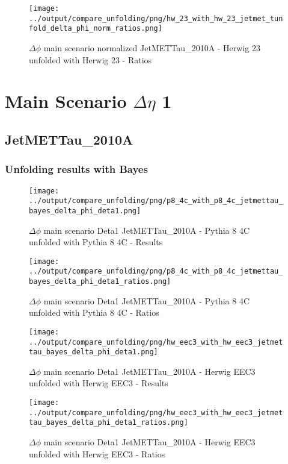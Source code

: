 \documentclass[11pt]{book}
\begin{document}
\begin{figure}[ht]
\centering
\texttt{[image: ../output/compare\_unfolding/png/hw\_23\_with\_hw\_23\_jetmet\_tunfold\_delta\_phi\_norm\_ratios.png]}
\caption{$\Delta\phi$ main scenario normalized JetMETTau\_2010A - Herwig 23 unfolded with Herwig 23 - Ratios}
\label{hw_23_jetmet_tunfold_delta_phi_norm_b}
\end{figure}




\clearpage
\chapter{Main Scenario $\Delta\eta$ 1 }
\section{JetMETTau\_2010A}
\subsection{Unfolding results with Bayes}

\begin{figure}[ht]
\centering
\texttt{[image: ../output/compare\_unfolding/png/p8\_4c\_with\_p8\_4c\_jetmettau\_bayes\_delta\_phi\_deta1.png]}
\caption{$\Delta\phi$ main scenario Deta1 JetMETTau\_2010A - Pythia 8 4C unfolded with Pythia 8 4C - Results}
\label{p8_p8_jetmettau_bayes_delta_phi_deta1_a}
\end{figure}

\begin{figure}[ht]
\centering
\texttt{[image: ../output/compare\_unfolding/png/p8\_4c\_with\_p8\_4c\_jetmettau\_bayes\_delta\_phi\_deta1\_ratios.png]}
\caption{$\Delta\phi$ main scenario Deta1 JetMETTau\_2010A - Pythia 8 4C unfolded with Pythia 8 4C - Ratios}
\label{p8_p8_jetmettau_bayes_delta_phi_deta1_b}
\end{figure}

\begin{figure}[ht]
\centering
\texttt{[image: ../output/compare\_unfolding/png/hw\_eec3\_with\_hw\_eec3\_jetmettau\_bayes\_delta\_phi\_deta1.png]}
\caption{$\Delta\phi$ main scenario Deta1 JetMETTau\_2010A - Herwig EEC3 unfolded with Herwig EEC3 - Results}
\label{hw_eec3_hw_eec3_jetmettau_bayes_delta_phi_deta1_a}
\end{figure}

\begin{figure}[ht]
\centering
\texttt{[image: ../output/compare\_unfolding/png/hw\_eec3\_with\_hw\_eec3\_jetmettau\_bayes\_delta\_phi\_deta1\_ratios.png]}
\caption{$\Delta\phi$ main scenario Deta1 JetMETTau\_2010A - Herwig EEC3 unfolded with Herwig EEC3 - Ratios}
\label{hw_eec3_hw_eec3_jetmettau_bayes_delta_phi_deta1_b}
\end{figure}
\end{document}

